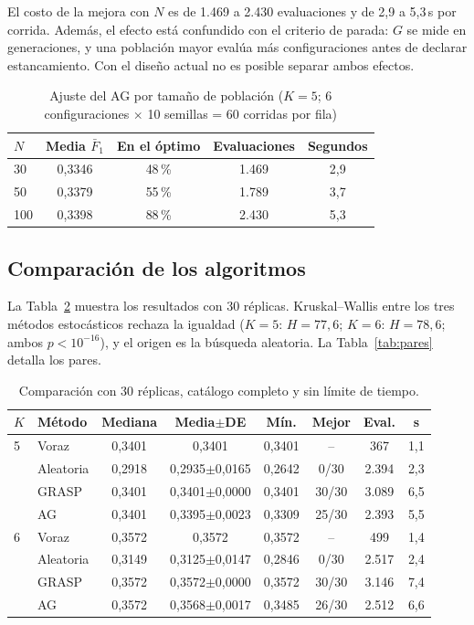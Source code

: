 \documentclass[conference]{IEEEtran}
\begin{document}
	El costo de la mejora con $N$ es de 1.469 a 2.430 evaluaciones y de 2,9 a 5,3\,s por corrida. Adem\'as, el efecto est\'a confundido con el criterio de parada: $G$ se mide en generaciones, y una poblaci\'on mayor eval\'ua m\'as configuraciones antes de declarar estancamiento. Con el dise\~no actual no es posible separar ambos efectos.
	
	\begin{table}[t]
		\centering
		\caption{Ajuste del AG por tama\~no de poblaci\'on ($K=5$; 6 configuraciones $\times$ 10 semillas = 60 corridas por fila)}
		\label{tab:ajuste}
		\footnotesize
		\begin{tabular}{lcccc}
			\toprule
			$N$ & Media $\bar F_1$ & En el \'optimo & Evaluaciones & Segundos \\
			\midrule
			30 & 0,3346 & 48\,\% & 1.469 & 2,9 \\
			50 & 0,3379 & 55\,\% & 1.789 & 3,7 \\
			100 & 0,3398 & 88\,\% & 2.430 & 5,3 \\
			\bottomrule
		\end{tabular}
	\end{table}
	
	\subsection{Comparaci\'on de los algoritmos}
	La Tabla~\ref{tab:comp} muestra los resultados con 30 r\'eplicas. Kruskal--Wallis entre los tres m\'etodos estoc\'asticos rechaza la igualdad ($K=5$: $H=77{,}6$; $K=6$: $H=78{,}6$; ambos $p<10^{-16}$), y el origen es la b\'usqueda aleatoria. La Tabla~\ref{tab:pares} detalla los pares.
	
	\begin{table}[t]
		\centering
		\caption{Comparaci\'on con 30 r\'eplicas, cat\'alogo completo y  sin límite de tiempo.}
		\label{tab:comp}
		\footnotesize
		\setlength{\tabcolsep}{3.5pt}
		\begin{tabular}{llcccccc}
			\toprule
			$K$ & M\'etodo & Mediana & Media$\pm$DE & M\'in. & Mejor & Eval. & s \\
			\midrule
			5 & Voraz & 0,3401 & 0,3401 & 0,3401 & -- & 367 & 1,1 \\
			& Aleatoria & 0,2918 & 0,2935$\pm$0,0165 & 0,2642 & 0/30 & 2.394 & 2,3 \\
			& GRASP & 0,3401 & 0,3401$\pm$0,0000 & 0,3401 & 30/30 & 3.089 & 6,5 \\
			& AG & 0,3401 & 0,3395$\pm$0,0023 & 0,3309 & 25/30 & 2.393 & 5,5 \\
			\midrule
			6 & Voraz & 0,3572 & 0,3572 & 0,3572 & -- & 499 & 1,4 \\
			& Aleatoria & 0,3149 & 0,3125$\pm$0,0147 & 0,2846 & 0/30 & 2.517 & 2,4 \\
			& GRASP & 0,3572 & 0,3572$\pm$0,0000 & 0,3572 & 30/30 & 3.146 & 7,4 \\
			& AG & 0,3572 & 0,3568$\pm$0,0017 & 0,3485 & 26/30 & 2.512 & 6,6 \\
			\bottomrule
		\end{tabular}
	\end{table}
	
\end{document}
